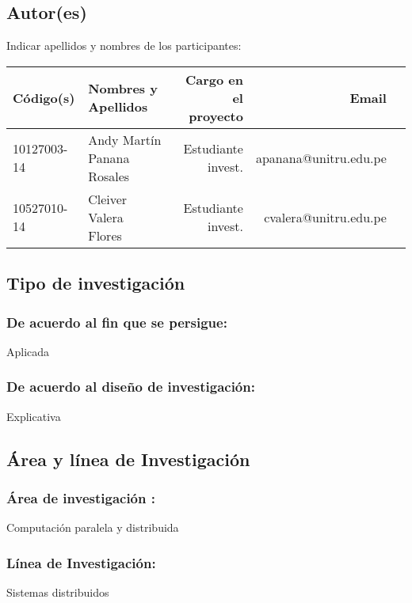 \subsection{Autor(es)}
Indicar apellidos y nombres de los participantes:
\begin{center}
    \begin{table}[!ht]
    \centering
        \begin{tabular}{llrrr} \toprule
        {\bf Código(s)} & {\bf Nombres y Apellidos} & {\bf Cargo en el proyecto} & {\bf Email} \\ \midrule
        10127003-14 & Andy Martín Panana Rosales & Estudiante invest. & apanana@unitru.edu.pe           \\
        10527010-14    & Cleiver Valera Flores & Estudiante invest. & cvalera@unitru.edu.pe            \\ \bottomrule
        \end{tabular}
    \end{table}
\end{center}

\subsection{Tipo de investigación}
    \subsubsection{De acuerdo al fin que se persigue:} 
    Aplicada
                    
    \subsubsection{De acuerdo al diseño de investigación:} 
    Explicativa

\subsection{Área y línea de Investigación}
    \subsubsection{Área de investigación :} 
    Computación paralela y distribuida
    
    \subsubsection{Línea de Investigación:} 
    Sistemas distribuidos
                
